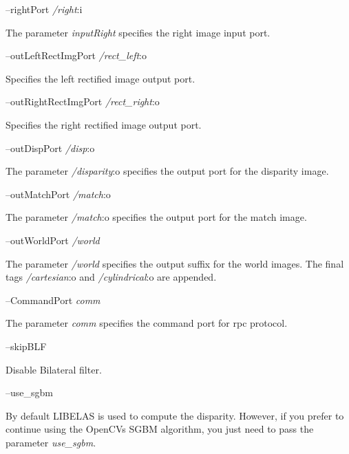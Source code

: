--right\+Port {\itshape /right}\+:i
\begin{DoxyItemize}
\item The parameter {\itshape input\+Right} specifies the right image input port.
\end{DoxyItemize}

--out\+Left\+Rect\+Img\+Port {\itshape /rect\+\_\+left}\+:o
\begin{DoxyItemize}
\item Specifies the left rectified image output port.
\end{DoxyItemize}

--out\+Right\+Rect\+Img\+Port {\itshape /rect\+\_\+right}\+:o
\begin{DoxyItemize}
\item Specifies the right rectified image output port.
\end{DoxyItemize}

--out\+Disp\+Port {\itshape /disp}\+:o
\begin{DoxyItemize}
\item The parameter {\itshape /disparity}\+:o specifies the output port for the disparity image.
\end{DoxyItemize}

--out\+Match\+Port {\itshape /match}\+:o
\begin{DoxyItemize}
\item The parameter {\itshape /match}\+:o specifies the output port for the match image.
\end{DoxyItemize}

--out\+World\+Port {\itshape /world} 
\begin{DoxyItemize}
\item The parameter {\itshape /world} specifies the output suffix for the world images. The final tags {\itshape /cartesian}\+:o and {\itshape /cylindrical}\+:o are appended.
\end{DoxyItemize}

--Command\+Port {\itshape comm} 
\begin{DoxyItemize}
\item The parameter {\itshape comm} specifies the command port for rpc protocol.
\end{DoxyItemize}

--skip\+B\+LF
\begin{DoxyItemize}
\item Disable Bilateral filter.
\end{DoxyItemize}

--use\+\_\+sgbm
\begin{DoxyItemize}
\item By default L\+I\+B\+E\+L\+AS is used to compute the disparity. However, if you prefer to continue using the Open\+CV\textquotesingle{}s S\+G\+BM algorithm, you just need to pass the parameter {\itshape use\+\_\+sgbm}.
\end{DoxyItemize}

